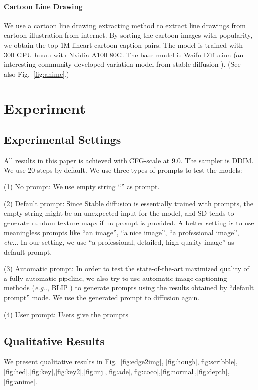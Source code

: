 \documentclass{article}
\makeatletter
\DeclareRobustCommand\onedot{\futurelet\@let@token\@onedot}
\def\@onedot{\ifx\@let@token.\else.\null\fi\xspace}
\def\eg{\emph{e.g}\onedot}
\def\etc{\emph{etc}\onedot}
\makeatother
\begin{document}
\paragraph{Cartoon Line Drawing} We use a cartoon line drawing extracting method \cite{Anime2Sketch} to extract line drawings from cartoon illustration from internet. By sorting the cartoon images with popularity, we obtain the top 1M lineart-cartoon-caption pairs. The model is trained with 300 GPU-hours with Nvidia A100 80G. The base model is Waifu Diffusion (an interesting community-developed variation model from stable diffusion \cite{waifu}). (See also Fig.~\ref{fig:anime}.)

\section{Experiment}

\subsection{Experimental Settings}

All results in this paper is achieved with CFG-scale at 9.0. The sampler is DDIM. We use 20 steps by default. We use three types of prompts to test the models:

(1) No prompt: We use empty string ``'' as prompt.

(2) Default prompt: Since Stable diffusion is essentially trained with prompts, the empty string might be an unexpected input for the model, and SD tends to generate random texture maps if no prompt is provided. A better setting is to use meaningless prompts like ``an image'', ``a nice image'', ``a professional image'', \etc. In our setting, we use ``a professional, detailed, high-quality image'' as default prompt.

(3) Automatic prompt: In order to test the state-of-the-art maximized quality of a fully automatic pipeline, we also try to use automatic image captioning methods (\eg, BLIP \cite{li2022blip}) to generate prompts using the results obtained by ``default prompt'' mode. We use the generated prompt to diffusion again.

(4) User prompt: Users give the prompts.

\subsection{Qualitative Results}

We present qualitative results in Fig.~\ref{fig:edge2img}, \ref{fig:hough},\ref{fig:scribble},\ref{fig:hed},\ref{fig:key},\ref{fig:key2},\ref{fig:mj},\ref{fig:ade},\ref{fig:coco},\ref{fig:normal},\ref{fig:depth},\ref{fig:anime}.
\end{document}
